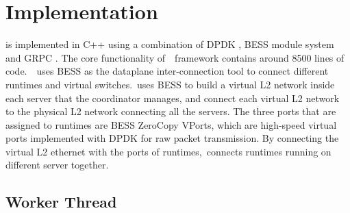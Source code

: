 \section{Implementation}
\label{sec:implementation}



\nfactor is implemented in C++ using a combination of DPDK \cite{dpdk}, BESS module system \cite{bess} and GRPC \cite{grpc}. The core functionality of~\nfactor~framework contains around 8500 lines of code.~\nfactor~uses BESS \cite{bess} as the dataplane inter-connection tool to connect different runtimes and virtual switches.~\nfactor uses BESS to build a virtual L2 network inside each server that the coordinator manages, and connect each virtual L2 network to the physical L2 network connecting all the servers. The three ports that are assigned to runtimes are BESS ZeroCopy VPorts, which are high-speed virtual ports implemented with DPDK for raw packet transmission. By connecting the virtual L2 ethernet with the ports of runtimes,~\nfactor connects runtimes running on different server together.

\subsection {Worker Thread}
\label{sec:BessModuleSys}



